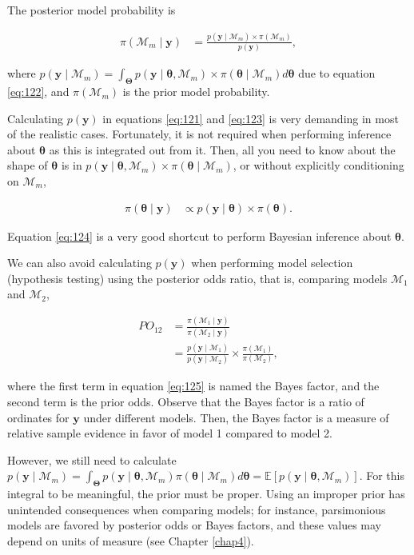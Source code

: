 The posterior model probability is

\begin{align}
	\pi(\mathcal{M}_m\mid \mathbf{y})&=\frac{p(\mathbf{y}\mid \mathcal{M}_m) \times \pi(\mathcal{M}_m)}{p(\mathbf{y})}, 
	\label{eq:123}
\end{align}

where $p(\mathbf{y}\mid \mathcal{M}_m)=\int_{\mathbf{\Theta}}p(\mathbf{y}\mid \bm{\theta},\mathcal{M}_m) \times \pi(\bm{\theta}\mid \mathcal{M}_m)d\bm{\theta}$ due to equation \ref{eq:122}, and $\pi(\mathcal{M}_m)$ is the prior model probability. 

Calculating \( p(\mathbf{y}) \) in equations \ref{eq:121} and \ref{eq:123} is very demanding in most of the realistic cases. Fortunately, it is not required when performing inference about \( \bm{\theta} \) as this is integrated out from it. Then, all you need to know about the shape of \( \bm{\theta} \) is in \( p(\mathbf{y} \mid \bm{\theta}, \mathcal{M}_m) \times \pi(\bm{\theta} \mid \mathcal{M}_m) \), or without explicitly conditioning on \( \mathcal{M}_m \),


\begin{align}
	\pi(\bm{\theta}\mid \mathbf{y})& \propto p(\mathbf{y}\mid \bm{\theta}) \times \pi(\bm{\theta}).
	\label{eq:124}
\end{align}

Equation \ref{eq:124} is a very good shortcut to perform Bayesian inference about \( \bm{\theta} \).

We can also avoid calculating \( p(\mathbf{y}) \) when performing model selection (hypothesis testing) using the posterior odds ratio, that is, comparing models \( \mathcal{M}_1 \) and \( \mathcal{M}_2 \),

\begin{align}
	PO_{12}&=\frac{\pi(\mathcal{M}_1\mid \mathbf{y})}{\pi(\mathcal{M}_2\mid \mathbf{y})} \nonumber \\
	&=\frac{p(\mathbf{y}\mid \mathcal{M}_1)}{p(\mathbf{y}\mid \mathcal{M}_2)}\times\frac{\pi(\mathcal{M}_1)}{\pi(\mathcal{M}_2)},
	\label{eq:125}
\end{align}

where the first term in equation \ref{eq:125} is named the Bayes factor, and the second term is the prior odds. Observe that the Bayes factor is a ratio of ordinates for \( \mathbf{y} \) under different models. Then, the Bayes factor is a measure of relative sample evidence in favor of model 1 compared to model 2.

However, we still need to calculate \( p(\mathbf{y}\mid \mathcal{M}_m) = \int_{\mathbf{\Theta}} p(\mathbf{y}\mid \bm{\theta}, \mathcal{M}_m) \pi(\bm{\theta}\mid \mathcal{M}_m) d\bm{\theta} = \mathbb{E}\left[ p(\mathbf{y}\mid \bm{\theta}, \mathcal{M}_m) \right] \). For this integral to be meaningful, the prior must be proper. Using an improper prior has unintended consequences when comparing models; for instance, parsimonious models are favored by posterior odds or Bayes factors, and these values may depend on units of measure (see Chapter \ref{chap4}).

